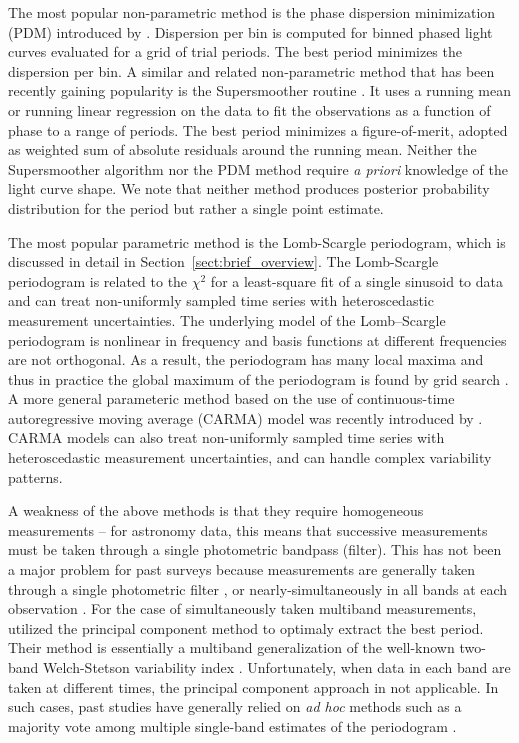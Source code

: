 \documentclass[12pt,preprint]{aastex}
\newcommand{\foreign}[1]{{\it #1}}
\newcommand{\apriori}{\foreign{a priori}}
\newcommand{\adhoc}{\foreign{ad hoc}}
\newcommand{\Sect}[1]{Section~\ref{sect:#1}}
\newcommand{\sect}[1]{\Sect{#1}}
\begin{document}
The most popular non-parametric method is the phase dispersion minimization (PDM) introduced by \cite{PDM1978}. 
Dispersion per bin is computed for binned phased light curves evaluated for a grid of trial periods. The best
period minimizes the dispersion per bin.  A similar and related non-parametric method that has been recently 
gaining popularity is the Supersmoother routine \citep{Reimann94}. It uses a running mean or running linear 
regression on the data to fit the observations as a function of phase to a range of periods. The best period 
minimizes a figure-of-merit, adopted as weighted sum of absolute residuals around the running mean. 
Neither the Supersmoother algorithm nor the PDM method require \apriori{} knowledge of the light curve shape. 
We note that neither method produces posterior probability distribution for the period but rather a single point 
estimate. 

The most popular parametric method is the Lomb-Scargle periodogram, which is discussed in detail in \sect{brief_overview}.
The Lomb-Scargle periodogram is related to the $\chi^2$ for a least-square fit of a single sinusoid to data
and can treat non-uniformly sampled time series with heteroscedastic measurement uncertainties. 
The underlying model of the Lomb–Scargle periodogram is nonlinear in frequency and basis functions at different
frequencies are not orthogonal. As a result, the periodogram has many local maxima and thus in practice the global 
maximum of the periodogram is found by grid search \citep[for details see, e.g.][]{ICVG2014}.
A more general parameteric method based on the use of continuous-time autoregressive moving average (CARMA) model
was recently introduced by \citet{Kelly14}. CARMA models can also treat non-uniformly sampled time series with 
heteroscedastic measurement uncertainties, and can handle complex variability patterns. 

A weakness of the above methods is that they require homogeneous measurements -- for astronomy data, this means 
that successive measurements must be taken through a single photometric bandpass (filter). This has not been a major
problem for past surveys because measurements are generally taken through a single photometric filter 
\citep [e.g. LINEAR,][]{LINEAR1}, or nearly-simultaneously in all bands at each observation \citep [e.g. SDSS,][]{Sesar2010}.
For the case of simultaneously taken multiband measurements, \cite{Suveges12} utilized the principal component
method to optimaly extract the best period. Their method is essentially a multiband generalization of the well-known
two-band Welch-Stetson variability index \citep{Stetson1996}. Unfortunately, when data in each band are taken at
different times, the  principal component approach in not applicable. In such cases, past studies have generally relied 
on \adhoc{} methods such as a majority vote among multiple single-band estimates of the 
periodogram \citep[e.g.,][]{Oluseyi12}. 
\end{document}
